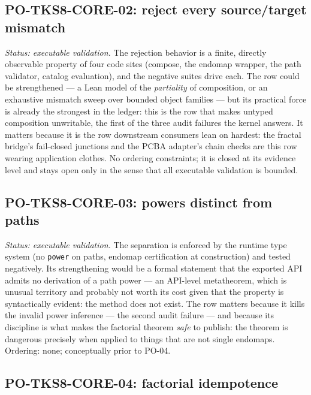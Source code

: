 \subsection{PO-TKS8-CORE-02: reject every source/target mismatch}

\emph{Status: executable validation.} The rejection behavior is a
finite, directly observable property of four code sites (compose, the
endomap wrapper, the path validator, catalog evaluation), and the
negative suites drive each. The row could be strengthened --- a Lean
model of the \emph{partiality} of composition, or an exhaustive
mismatch sweep over bounded object families --- but its practical
force is already the strongest in the ledger: this is the row that
makes untyped composition unwritable, the first of the three audit
failures the kernel answers. It matters because it is the row
downstream consumers lean on hardest: the fractal bridge's fail-closed
junctions and the PCBA adapter's chain checks are this row wearing
application clothes. No ordering constraints; it is closed at its
evidence level and stays open only in the sense that all executable
validation is bounded.

\subsection{PO-TKS8-CORE-03: powers distinct from paths}

\emph{Status: executable validation.} The separation is enforced by
the runtime type system (no \texttt{power} on paths, endomap
certification at construction) and tested negatively. Its
strengthening would be a formal statement that the exported API admits
no derivation of a path power --- an API-level metatheorem, which is
unusual territory and probably not worth its cost given that the
property is syntactically evident: the method does not exist. The row
matters because it kills the invalid power inference --- the second
audit failure --- and because its discipline is what makes the
factorial theorem \emph{safe} to publish: the theorem is dangerous
precisely when applied to things that are not single endomaps.
Ordering: none; conceptually prior to PO-04.

\subsection{PO-TKS8-CORE-04: factorial idempotence}

